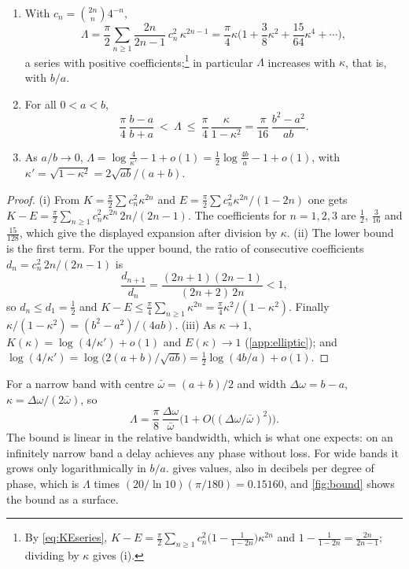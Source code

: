 \begin{proposition}\label{prop:Lambda}
\begin{enumerate}
\item[(i)] With $c_n=\binom{2n}{n}4^{-n}$,
\[
\Lambda=\frac\pi2\sum_{n\ge1}\frac{2n}{2n-1}\,c_n^2\,\kappa^{2n-1}
=\frac\pi4\kappa\Big(1+\frac38\kappa^2+\frac{15}{64}\kappa^4+\cdots\Big),
\]
a series with positive coefficients;\footnote{By \eqref{eq:KEseries}, $K-E=\frac\pi2\sum_{n\ge1}c_n^2\big(1-\frac1{1-2n}\big)\kappa^{2n}$ and $1-\frac1{1-2n}=\frac{2n}{2n-1}$; dividing by $\kappa$ gives (i).} in particular $\Lambda$ increases with
$\kappa$, that is, with $b/a$.
\item[(ii)] For all $0<a<b$,
\[
\frac\pi4\,\frac{b-a}{b+a}\ <\ \Lambda\ \le\ \frac\pi4\,\frac{\kappa}{1-\kappa^2}
=\frac\pi{16}\,\frac{b^2-a^2}{ab}.
\]
\item[(iii)] As $a/b\to0$,
$\Lambda=\log\frac{4}{\kappa'}-1+o(1)=\frac12\log\frac{4b}{a}-1+o(1)$,
with $\kappa'=\sqrt{1-\kappa^2}=2\sqrt{ab}/(a+b)$.
\end{enumerate}
\end{proposition}

\begin{proof}
(i) From $K=\frac\pi2\sum c_n^2\kappa^{2n}$ and
$E=\frac\pi2\sum c_n^2\kappa^{2n}/(1-2n)$ one gets
$K-E=\frac\pi2\sum_{n\ge1}c_n^2\kappa^{2n}\,2n/(2n-1)$. The coefficients for
$n=1,2,3$ are $\frac12$, $\frac3{16}$ and $\frac{15}{128}$, which give the
displayed expansion after division by $\kappa$.
(ii) The lower bound is the first term. For the upper bound, the ratio of
consecutive coefficients $d_n=c_n^2\,2n/(2n-1)$ is
\[
\frac{d_{n+1}}{d_n}=\frac{(2n+1)(2n-1)}{(2n+2)\,2n}<1,
\]
so $d_n\le d_1=\frac12$ and $K-E\le\frac\pi4\sum_{n\ge1}\kappa^{2n}
=\frac\pi4\kappa^2/(1-\kappa^2)$. Finally $\kappa/(1-\kappa^2)=(b^2-a^2)/(4ab)$.
(iii) As $\kappa\to1$, $K(\kappa)=\log(4/\kappa')+o(1)$ and $E(\kappa)\to1$
(\cref{app:elliptic}); and $\log(4/\kappa')=\log\big(2(a+b)/\sqrt{ab}\big)
=\frac12\log(4b/a)+o(1)$.
\end{proof}

For a narrow band with centre $\bar\omega=(a+b)/2$ and width
$\Delta\omega=b-a$, $\kappa=\Delta\omega/(2\bar\omega)$, so
\begin{equation}\label{eq:narrow}
\Lambda=\frac\pi8\,\frac{\Delta\omega}{\bar\omega}
\Big(1+O\big((\Delta\omega/\bar\omega)^2\big)\Big).
\end{equation}
The bound is linear in the relative bandwidth, which is what one expects: on
an infinitely narrow band a delay achieves any phase without loss. For wide
bands it grows only logarithmically in $b/a$.  gives values,
also in decibels per degree of phase, which is $\Lambda$ times
$(20/\ln 10)(\pi/180)=0.15160$, and \cref{fig:bound} shows the bound as a
surface.

